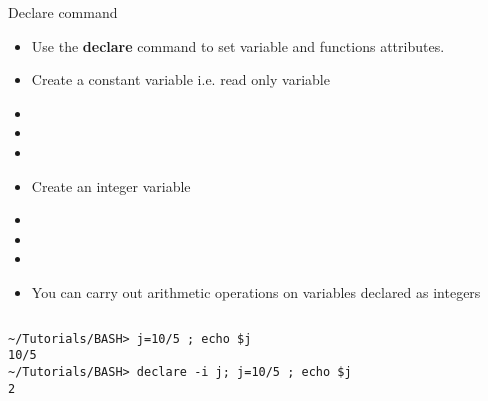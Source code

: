 \documentclass[10pt,t]{beamer}
\begin{document}
\begin{frame}[fragile]{Declare command}
  \begin{itemize}
    \item Use the \textbf{declare} command to set variable and functions attributes.
    \item Create a constant variable i.e. read only variable
    \item[] 
    \item[] 
    \item[] 
    \item Create an integer variable
    \item[]  
    \item[] 
    \item[] 
    \item You can carry out arithmetic operations on variables declared as integers
  \end{itemize}
  \begin{columns}
    \column{8cm}
      \begin{lstlisting}[style=LINUX]
~/Tutorials/BASH> j=10/5 ; echo $j
10/5
~/Tutorials/BASH> declare -i j; j=10/5 ; echo $j
2
      \end{lstlisting}
  \end{columns}
\end{frame}
\end{document}
